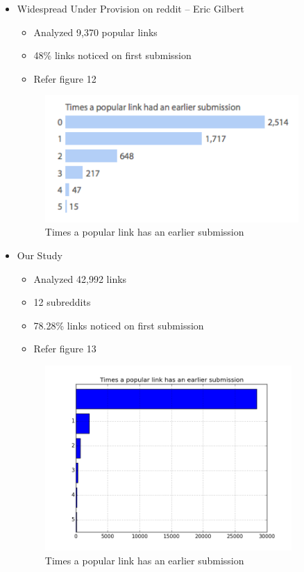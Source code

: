 \documentclass{article} %
\begin{document}
\begin{itemize}
\item Widespread Under Provision on reddit -- Eric Gilbert
	\begin{itemize}
	\item Analyzed 9,370 popular links
	\item 48\% links noticed on first submission
	\item Refer figure 12
	\end{itemize}
	
	\begin{figure}[h]
	\begin{center}
	\includegraphics[width=3.8in]{eric.png}
	\caption{Times a popular link has an earlier submission}
	\end{center}
	\end{figure}
	
\item Our Study
	\begin{itemize}
	\item Analyzed 42,992 links
	\item 12 subreddits
	\item 78.28\% links noticed on first submission
	\item Refer figure 13
	\end{itemize}
	
	\begin{figure}[h]
	\begin{center}
	\includegraphics[width=3.7in]{count.png}
	\caption{Times a popular link has an earlier submission}
	\end{center}
	\end{figure}
\end{itemize}
\end{document}
